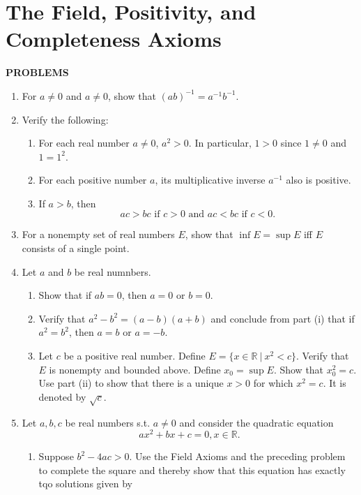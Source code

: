 \documentclass[a4paper,10pt]{book}
\theoremstyle{plain} %
\begin{document}
\section{The Field, Positivity, and Completeness Axioms}
\begin{center}
	\textbf{PROBLEMS}
\end{center}
\begin{enumerate}
	\setcounter{enumi}{0}
	\item For $a\neq 0$ and $a\neq 0$, show that $(ab)^{-1} = a^{-1}b^{-1}$.
	\item Verify the following:
	\begin{enumerate}[label=(\roman*),align=left]
        \item For each real number $a\neq 0$, $a^2>0$. In particular, $1>0$ since $1 \neq 0$ and $1=1^2$.
        \item For each positive number $a$, its multiplicative inverse  $a^{-1}$ also is positive.
        \item If $a>b$, then \[ ac >bc \text{ if } c>0 \text{ and } ac < bc \text{ if } c<0. \]
    \end{enumerate}
	\item For a nonempty set of real numbers $E$, show that $\inf E = \sup E$ iff $E$ consists of a single point.
	\item Let $a$ and $b$ be real numnbers.
	\begin{enumerate}[label=(\roman*),align=left]
        \item Show that if $ab = 0$, then $a=0$ or $b=0$.
        \item Verify that $a^2 -b^2 = (a-b)(a+b)$ and conclude from part (i) that if $a^2 = b^2$, then $a=b$ or $a=-b$.
        \item Let $c$ be a positive real number. Define $E = \{ x \in \mathbb{R} \ |\  x^2 < c\}$. Verify that $E$ is nonempty and bounded above. 
		Define $x_0 = \sup E$. Show that $x_0^2 = c$. Use part (ii) to show that there is a unique $x>0$ for which $x^2=c$. It is denoted by $\sqrt{c}$.
    \end{enumerate}
	\item Let $a,b,c$ be real numbers s.t. $a\neq 0$ and consider the quadratic equation \[ ax^2+bx+c=0, x \in \mathbb{R}.\]
	\begin{enumerate}[label=(\roman*),align=left]
        \item Suppose $b^2 - 4ac >0$. Use the Field Axioms and the preceding problem to complete the square and thereby show that this equation has exactly tqo solutions given by

\end{enumerate}
\end{enumerate}
\end{document}
